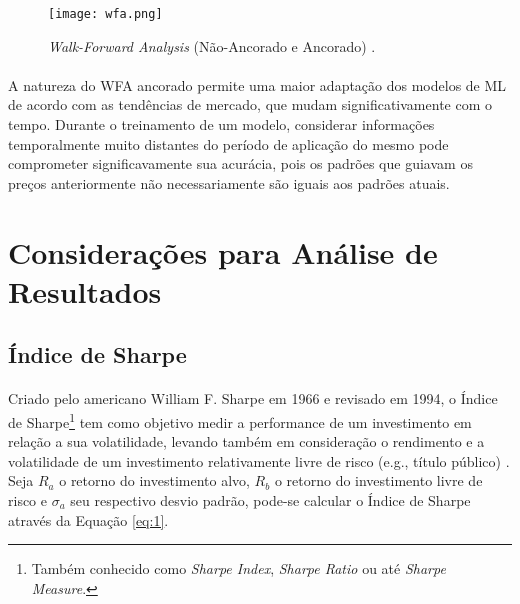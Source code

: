 \begin{figure}[h]
    \texttt{[image: wfa.png]}
    \centering
    \caption{\textit{Walk-Forward Analysis} (Não-Ancorado e Ancorado) \cite{wfo}.}
    \label{fig:10}
\end{figure}

\paragraph{} A natureza do WFA ancorado permite uma maior adaptação dos modelos de ML de acordo com as tendências de mercado, que mudam significativamente com o tempo. Durante o treinamento de um modelo, considerar informações temporalmente muito distantes do período de aplicação do mesmo pode comprometer significavamente sua acurácia, pois os padrões que guiavam os preços anteriormente não necessariamente são iguais aos padrões atuais.



\section{Considerações para Análise de Resultados}

\subsection{Índice de Sharpe}

\paragraph{} Criado pelo americano William F. Sharpe em 1966 e revisado em 1994, o Índice de Sharpe\footnote{Também conhecido como \textit{Sharpe Index}, \textit{Sharpe Ratio} ou até \textit{Sharpe Measure}.} tem como objetivo medir a performance de um investimento em relação a sua volatilidade, levando também em consideração o rendimento e a volatilidade de um investimento relativamente livre de risco (e.g., título público) \cite{sharpe1998sharpe}. Seja \begin{math}R_a\end{math} o retorno do investimento alvo, \begin{math}R_b\end{math} o retorno do investimento livre de risco e \begin{math}\sigma_a\end{math} seu respectivo desvio padrão, pode-se calcular o Índice de Sharpe através da Equação \ref{eq:1}.

